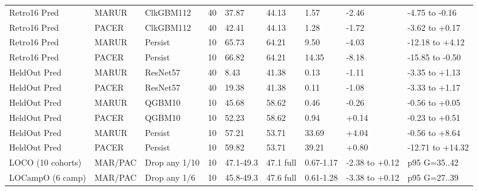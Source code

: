 \begin{table}[!ht]
\begin{tabular}{lllllllll}
Retro16 Pred & MARUR & ClkGBM112 & 40 & 37.87 & 44.13 & 1.57 & -2.46 & -4.75 to -0.16 \\
Retro16 Pred & PACER & ClkGBM112 & 40 & 42.41 & 44.13 & 1.28 & -1.72 & -3.62 to +0.17 \\
Retro16 Pred & MARUR & Persist & 10 & 65.73 & 64.21 & 9.50 & -4.03 & -12.18 to +4.12 \\
Retro16 Pred & PACER & Persist & 10 & 66.82 & 64.21 & 14.35 & -8.18 & -15.85 to -0.50 \\
HeldOut Pred & MARUR & ResNet57 & 40 & 8.43 & 41.38 & 0.13 & -1.11 & -3.35 to +1.13 \\
HeldOut Pred & PACER & ResNet57 & 40 & 19.38 & 41.38 & 0.11 & -1.08 & -3.33 to +1.17 \\
HeldOut Pred & MARUR & QGBM10 & 10 & 45.68 & 58.62 & 0.46 & -0.26 & -0.56 to +0.05 \\
HeldOut Pred & PACER & QGBM10 & 10 & 52.23 & 58.62 & 0.94 & +0.14 & -0.23 to +0.51 \\
HeldOut Pred & MARUR & Persist & 10 & 57.21 & 53.71 & 33.69 & +4.04 & -0.56 to +8.64 \\
HeldOut Pred & PACER & Persist & 10 & 59.82 & 53.71 & 39.21 & +0.80 & -12.71 to +14.32 \\
LOCO (10 cohorts) & MAR/PAC & Drop any 1/10 & 10 & 47.1-49.3 & 47.1 full & 0.67-1.17 & -2.38 to +0.12 & p95 G=35..42 \\
LOCampO (6 camp) & MAR/PAC & Drop any 1/6 & 10 & 45.8-49.3 & 47.6 full & 0.61-1.28 & -3.38 to +0.12 & p95 G=27..39 \\
\hline
\end{tabular}
\end{table}
